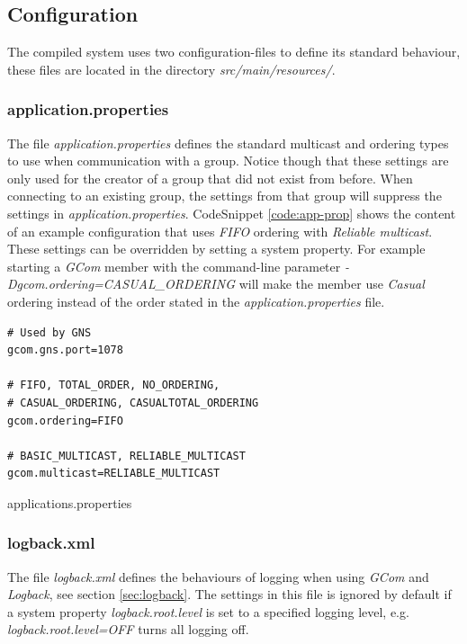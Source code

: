 \documentclass[titlepage, twocolumn, a4paper, 10pt]{article}
\begin{document}
\subsection{Configuration}\label{sec:configuration}
The compiled system uses two configuration-files to define its
standard behaviour, these files are located in the directory
\textit{src/main/resources/}.

\subsubsection{application.properties}\label{sec:application.properties}
The file \textit{application.properties} defines the standard
multicast and ordering types to use when communication with a group.
Notice though that these settings are only used for the creator of a
group that did not exist from before. When connecting to an existing
group, the settings from that group will suppress the settings in
\textit{application.properties}. CodeSnippet \ref{code:app-prop} shows
the content of an example configuration that uses \textit{FIFO}
ordering with \textit{Reliable multicast}. These settings can be
overridden by setting a system property. For example starting a
\textit{GCom} member with the command-line parameter
\mbox{\textit{-Dgcom.ordering=CASUAL\_ORDERING}} will make the member
use \textit{Casual} ordering instead of the order stated in the
\textit{application.properties} file.

\begin{code}
  \begin{footnotesize}
\begin{verbatim}
# Used by GNS
gcom.gns.port=1078

# FIFO, TOTAL_ORDER, NO_ORDERING,
# CASUAL_ORDERING, CASUALTOTAL_ORDERING
gcom.ordering=FIFO

# BASIC_MULTICAST, RELIABLE_MULTICAST
gcom.multicast=RELIABLE_MULTICAST
\end{verbatim}
  \end{footnotesize}
  \caption{applications.properties}\label{code:app-prop}
\end{code}

\subsubsection{logback.xml}\label{sec:logback.xml}
The file \textit{logback.xml} defines the behaviours of logging when
using \textit{GCom} and \textit{Logback}, see section
\ref{sec:logback}. The settings in this file is ignored by default if
a system property \textit{logback.root.level} is set to a specified
logging level, e.g. \textit{\textit{logback.root.level=OFF}} turns all
logging off.
\end{document}
